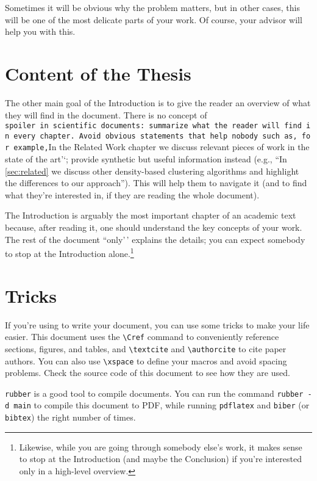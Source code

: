 Sometimes it will be obvious why the problem matters, but in other
cases, this will be one of the most delicate parts of your work. Of
course, your advisor will help you with this.

\section{Content of the Thesis}

The other main goal of the Introduction is to give the reader an
overview of what they will find in the document. There is no concept of
\texttt{spoiler\textquotesingle{}\textquotesingle{}\ in\ scientific\ documents:\ summarize\ what\ the\ reader\ will\ find\ in\ every\ chapter.\ Avoid\ obvious\ statements\ that\ help\ nobody\ such\ as,\ for\ example,}In
the Related Work chapter we discuss relevant pieces of work in the state
of the art'`; provide synthetic but useful information instead (e.g.,
``In \cref{sec:related} we discuss other density-based clustering
algorithms and highlight the differences to our approach''). This will
help them to navigate it (and to find what they're interested in, if
they are reading the whole document).

The Introduction is arguably the most important chapter of an academic
text because, after reading it, one should understand the key concepts
of your work. The rest of the document ``only'\,' explains the details;
you can expect somebody to stop at the Introduction
alone.\footnote{Likewise, while you are going through somebody else's work, it makes sense to stop at the Introduction (and maybe the Conclusion) if you're interested only in a high-level overview.}

\section{\latex Tricks}

If you're using \latex to write your document, you can use some tricks
to make your life easier. This document uses the \verb|\Cref| command to
conveniently reference sections, figures, and tables, and
\verb|\textcite| and \verb|\authorcite| to cite paper authors. You can
also use \verb|\xspace| to define your macros and avoid spacing
problems. Check the source code of this document to see how they are
used.

\texttt{rubber} is a good tool to compile \latex documents. You can run
the command \texttt{rubber -d main} to compile this document to PDF,
while running \texttt{pdflatex} and \texttt{biber} (or \texttt{bibtex})
the right number of times.

